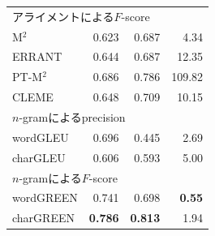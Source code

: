 \documentclass[11pt]{beamer}
\newenvironment{backblock}{%
		\begin{tcolorbox}[ 
			enhanced,
			fonttitle=\bfseries,
			colframe=gray,
			colback=gray!5!,
			colbacktitle=gray!80,
			attach boxed title to top left={yshift=-2mm, xshift=2mm}]
			\vskip2mm
			}{%
		\end{tcolorbox}
		}
\begin{document}
\begin{frame}[t]
\begin{columns}[t]
\begin{column}{.50\linewidth}
\begin{backblock}
\begin{table}[!t]
\begin{tabular}{lrrr}
									\multicolumn{4}{l}{アライメントによる$F$-score} \\
									M${}^2$ & 0.623 & 0.687 & 4.34 \\
									ERRANT & 0.644 & 0.687 & 12.35 \\
									PT-M${}^2$ & 0.686 & 0.786 & 109.82 \\
									CLEME & 0.648 & 0.709 & 10.15 \\
									\hline
									\multicolumn{4}{l}{$n$-gramによるprecision} \\
									wordGLEU & 0.696 & 0.445 & 2.69 \\
									charGLEU & 0.606 & 0.593 & 5.00 \\
									\hline
									\multicolumn{4}{l}{$n$-gramによる$F$-score} \\
									wordGREEN & 0.741 & 0.698 & \textbf{0.55} \\
									charGREEN & \textbf{0.786} & \textbf{0.813} & 1.94 \\ \hline
								\end{tabular}
							\end{table}
						\end{backblock}


\end{column}
\end{columns}
\end{frame}
\end{document}

